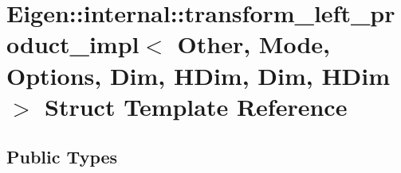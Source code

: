 \hypertarget{struct_eigen_1_1internal_1_1transform__left__product__impl_3_01_other_00_01_mode_00_01_options_037bfaa634250d504931892f5ae22fc66}{}\section{Eigen\+:\+:internal\+:\+:transform\+\_\+left\+\_\+product\+\_\+impl$<$ Other, Mode, Options, Dim, H\+Dim, Dim, H\+Dim $>$ Struct Template Reference}
\label{struct_eigen_1_1internal_1_1transform__left__product__impl_3_01_other_00_01_mode_00_01_options_037bfaa634250d504931892f5ae22fc66}
\subsection*{Public Types}
